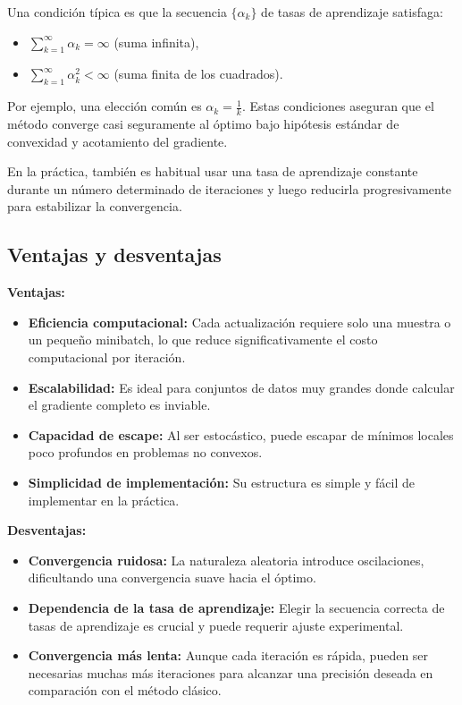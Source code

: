 \documentclass[12pt, letterpaper,conference]{IEEEtran}
\begin{document}
Una condición típica es que la secuencia \( \{\alpha_k\} \) de tasas de aprendizaje satisfaga:

\begin{itemize}
    \item \( \sum_{k=1}^{\infty} \alpha_k = \infty \) (suma infinita),
    \item \( \sum_{k=1}^{\infty} \alpha_k^2 < \infty \) (suma finita de los cuadrados).
\end{itemize}

Por ejemplo, una elección común es \( \alpha_k = \frac{1}{k} \). Estas condiciones aseguran que el método converge casi seguramente al óptimo bajo hipótesis estándar de convexidad y acotamiento del gradiente.

En la práctica, también es habitual usar una tasa de aprendizaje constante durante un número determinado de iteraciones y luego reducirla progresivamente para estabilizar la convergencia.


\vspace{0.25cm}

\subsection{Ventajas y desventajas}

\textbf{Ventajas:}
\begin{itemize}
    \item \textbf{Eficiencia computacional:} Cada actualización requiere solo una muestra o un pequeño minibatch, lo que reduce significativamente el costo computacional por iteración.
    \item \textbf{Escalabilidad:} Es ideal para conjuntos de datos muy grandes donde calcular el gradiente completo es inviable.
    \item \textbf{Capacidad de escape:} Al ser estocástico, puede escapar de mínimos locales poco profundos en problemas no convexos.
    \item \textbf{Simplicidad de implementación:} Su estructura es simple y fácil de implementar en la práctica.
\end{itemize}

\textbf{Desventajas:}
\begin{itemize}
    \item \textbf{Convergencia ruidosa:} La naturaleza aleatoria introduce oscilaciones, dificultando una convergencia suave hacia el óptimo.
    \item \textbf{Dependencia de la tasa de aprendizaje:} Elegir la secuencia correcta de tasas de aprendizaje es crucial y puede requerir ajuste experimental.
    \item \textbf{Convergencia más lenta:} Aunque cada iteración es rápida, pueden ser necesarias muchas más iteraciones para alcanzar una precisión deseada en comparación con el método clásico.
\end{itemize}
\end{document}
